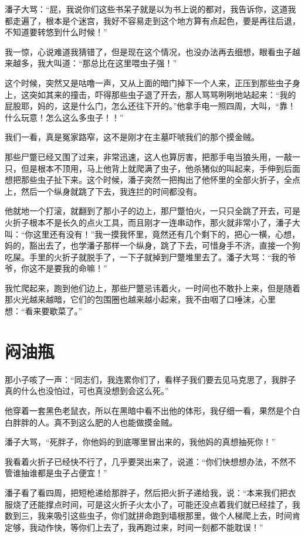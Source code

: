 潘子大骂：“屁，我说你们这些书呆子就是以为书上说的都对，我告诉你，这道我都走遍了，根本是个迷宫，我好不容易走到这个地方算有点起色，要是再往后退，不知道要转悠到什么时候！”

我一惊，心说难道我猜错了，但是现在这个情况，也没办法再去细想，眼看虫子越来越多，我大叫道：“那总比在这里喂虫子强！”

这个时候，突然又是咕噜一声，又从上面的暗门掉下一个人来，正压到那些虫子身上，这突如其来的撞击，吓得那些虫子退了开去，那人骂骂咧咧地站起来：“我的屁股耶，妈的，这是什么门，怎么还往下开的。”他拿手电一照四周，大叫，“靠！什么玩意！怎么这么多虫子！！”

我们一看，真是冤家路窄，这不是刚才在主墓吓唬我们的那个摸金贼。

那些尸蹩已经又围了过来，非常迅速，这人也算厉害，把那手电当狼头用，一敲一只，但是根本不顶用，马上他背上就爬满了虫子，他杀猪似的叫起来，手伸到后面想把那些虫子扯下来。这个时候，潘子突然一把掏出了他怀里的全部火折子，全点上，然后一个纵身就跳了下去，我连拦的时间都没有。

他就地一个打滚，就翻到了那小子的边上，那尸蹩怕火，一只只全跳了开去，可是火折子根本不是长久的点火工具，而且刚才一连串动作，那火就非常小了，潘子大叫：“你这里还有没有！”我一摸我怀里，竟然还有几个剩下的，把心一横，心想，妈的，豁出去了，也学潘子那样一个纵身，跳了下去，可惜身手不济，直接一个狗吃屎。手里的火折子就脱手了，一下子就掉到尸蹩堆里去了。潘子大骂：“我的爷爷，你这不是要我的命嘛！”

我忙爬起来，跑到他们边上，那些尸蹩忌讳着火，一时间也不敢扑上来，但是随着那火光越来越暗，它们的包围圈也越来越小起来，我不由咽了口唾沫，心里想：“看来要歇菜了。”

\chapter{闷油瓶}

那小子咳了一声：“同志们，我连累你们了，看样子我们要去见马克思了，我胖子真的什么也没怕过，可也真没想到会这么死。”

他穿着一套黑色老鼠衣，所以在黑暗中看不出他的体形，我仔细一看，果然是个白白胖胖的人。真不到这么肥的人也能做摸金贼。

潘子大骂，“死胖子，你他妈的到底哪里冒出来的，我他妈的真想抽死你！”

我看着火折子已经快不行了，几乎要哭出来了，说道：“你们快想想办法，不然不管谁抽谁都是虫子占便宜！”

潘子看了看四周，把短枪递给那胖子，然后把火折子递给我，说：“本来我们把衣服烧了还能撑点时间，可是这火折子火太小了，可能还没点着我们就已经挂了，我数到三，我来吸引这些虫子，你们就拼命跑到墙根那里，做个人梯爬上去，时间肯定够，我动作快，等你们上去了，我再跑过来，时间一刻都不能耽误！”

